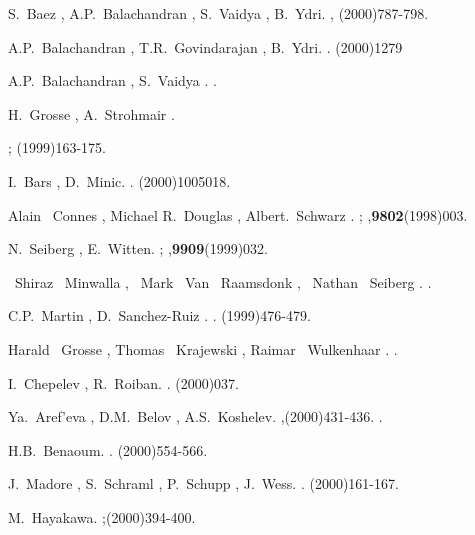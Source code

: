 \documentclass[a4paper,12pt]{article}
\begin{document}
\begin{thebibliography}{10}
S.~Baez , A.P.~Balachandran , S.~Vaidya , B.~Ydri.
 ,
(2000)787-798.

A.P.~Balachandran , T.R.~Govindarajan , B.~Ydri.
 .
(2000)1279

A.P.~Balachandran , S.~Vaidya .
.

H.~Grosse , A.~Strohmair .

;
(1999)163-175.


I.~Bars , D.~Minic.
.
(2000)1005018.







Alain ~Connes , Michael R.~Douglas , Albert.~Schwarz .
;
,{\bf 9802}(1998)003.

N.~Seiberg , E.~Witten.
;
,{\bf 9909}(1999)032.




~Shiraz ~Minwalla , ~Mark ~Van ~Raamsdonk , ~Nathan ~Seiberg .
.

C.P.~Martin , D.~Sanchez-Ruiz .
.
(1999)476-479.

Harald ~Grosse , Thomas ~Krajewski , Raimar ~Wulkenhaar .
.

I.~Chepelev , R.~Roiban.
.
(2000)037.

Ya.~Aref'eva , D.M.~Belov , A.S.~Koshelev.
,(2000)431-436.
.

H.B.~Benaoum.
.
(2000)554-566.

J.~Madore , S.~Schraml , P.~Schupp , J.~Wess.
.
(2000)161-167.

M.~Hayakawa.
;(2000)394-400.


\end{thebibliography}
\end{document}
